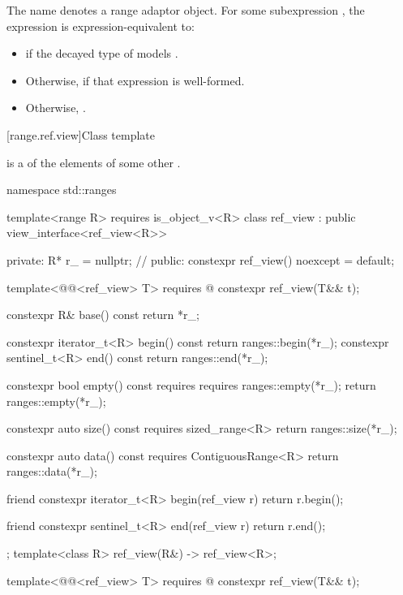 \pnum
The name  denotes a
range adaptor object.
For some subexpression , the expression
 is expression-equivalent to:

\begin{itemize}
\item {} if the decayed type of 
models .

\item Otherwise,  if that expression is well-formed.

\item Otherwise, .
\end{itemize}

[range.ref.view]{Class template }

\pnum
{} is a  of the elements of some other .
\begin{codeblock}
namespace std::ranges {
  template<range R>
    requires is_object_v<R>
  class ref_view : public view_interface<ref_view<R>> {
  private:
    R* r_ = nullptr;            // \expos
  public:
    constexpr ref_view() noexcept = default;

    template<@@<ref_view> T>
      requires @\seebelow@
    constexpr ref_view(T&& t);

    constexpr R& base() const { return *r_; }

    constexpr iterator_t<R> begin() const { return ranges::begin(*r_); }
    constexpr sentinel_t<R> end() const { return ranges::end(*r_); }

    constexpr bool empty() const
      requires requires { ranges::empty(*r_); }
    { return ranges::empty(*r_); }

    constexpr auto size() const requires sized_range<R>
    { return ranges::size(*r_); }

    constexpr auto data() const requires ContiguousRange<R>
    { return ranges::data(*r_); }

    friend constexpr iterator_t<R> begin(ref_view r)
    { return r.begin(); }

    friend constexpr sentinel_t<R> end(ref_view r)
    { return r.end(); }
  };
  template<class R>
    ref_view(R&) -> ref_view<R>;
}
\end{codeblock}

%
\begin{itemdecl}
template<@@<ref_view> T>
  requires @\seebelow@
constexpr ref_view(T&& t);
\end{itemdecl}

